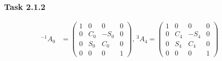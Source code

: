 \subsubsection*{Task 2.1.2}
\begin{align*}
^{-1}A_0 &= 
\begin{pmatrix}
1 & 0 & 0 & 0 \\
0 & C_0 & -S_0 & 0 \\
0 & S_0 & C_0 & 0 \\
0 & 0 & 0 & 1 
\end{pmatrix},
\,^{3}A_4 =
\begin{pmatrix}
1 & 0 & 0 & 0 \\
0 & C_4 & -S_4 & 0 \\
0 & S_4 & C_4 & 0 \\
0 & 0 & 0 & 1 
\end{pmatrix}
\end{align*}
